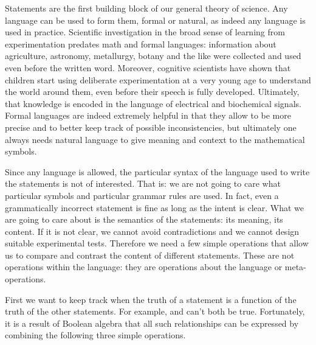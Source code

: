 \documentclass[11pt,letterpaper,fleqn]{memoir} %
\begin{document}
Statements are the first building block of our general theory of science. Any language can be used to form them, formal or natural, as indeed any language is used in practice. Scientific investigation in the broad sense of learning from experimentation predates math and formal languages: information about agriculture, astronomy, metallurgy, botany and the like were collected and used even before the written word. Moreover, cognitive scientists have shown that children start using deliberate experimentation at a very young age to understand the world around them, even before their speech is fully developed. Ultimately, that knowledge is encoded in the language of electrical and biochemical signals. Formal languages are indeed extremely helpful in that they allow to be more precise and to better keep track of possible inconsistencies, but ultimately one always needs natural language to give meaning and context to the mathematical symbols. 

Since any language is allowed, the particular syntax of the language used to write the statements is not of interested. That is: we are not going to care what particular symbols and particular grammar rules are used. In fact, even a grammatically incorrect statement is fine as long as the intent is clear. What we are going to care about is the semantics of the statements: its meaning, its content. If it is not clear, we cannot avoid contradictions and we cannot design suitable experimental tests. Therefore we need a few simple operations that allow us to compare and contrast the content of different statements. These are not operations within the language: they are operations about the language or meta-operations.


First we want to keep track when the truth of a statement is a function of the truth of the other statements. For example,  and  can't both be true. Fortunately, it is a result of Boolean algebra that all such relationships can be expressed by combining the following three simple operations.
\end{document}
